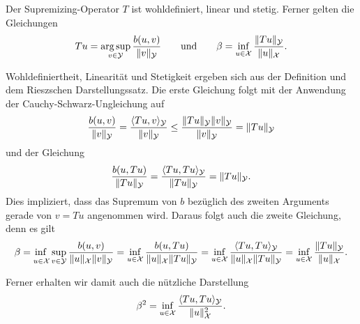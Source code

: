 \documentclass[../main.tex]{subfiles}
\begin{document}
\begin{Lemma}\label{lemma:supremizing_operator}
    Der Supremizing-Operator $T$ ist wohldefiniert, linear und stetig.
    Ferner gelten die Gleichungen
    \begin{equation}
        \label{eq:supremizing_operator_ist_argsup}
        Tu = \operatorname*{arg\,sup}_{v \in \mathcal Y} \frac{b(u, v)}{\lVert v\rVert_{\mathcal Y}}
        \qquad\text{und}\qquad
        \beta = \inf_{u \in \mathcal X} \frac{\lVert Tu\rVert_{\mathcal Y}}{\lVert u\rVert_{\mathcal X}}.
    \end{equation}

    \begin{Beweis}
        Wohldefiniertheit, Linearität und Stetigkeit ergeben sich aus der Definition und dem Rieszschen Darstellungssatz.
        Die erste Gleichung folgt mit der Anwendung der Cauchy-Schwarz-Ungleichung auf
        \begin{equation}
            \frac{b(u, v)}{\lVert v\rVert_{\mathcal Y}}
            = \frac{\langle Tu,v\rangle_{\mathcal Y}}{\lVert v\rVert_{\mathcal Y}}
            \leq \frac{\lVert Tu\rVert_{\mathcal Y} \lVert v\rVert_{\mathcal Y}}{\lVert v\rVert_{\mathcal Y}}
            = \lVert Tu\rVert_{\mathcal Y}
        \end{equation}
        und der Gleichung
        \begin{equation}
            \frac{b(u, Tu)}{\lVert Tu\rVert_{\mathcal Y}}
            = \frac{\langle Tu,Tu\rangle_{\mathcal Y}}{\lVert Tu\rVert_{\mathcal Y}}
            = \lVert Tu\rVert_{\mathcal Y}.
        \end{equation}
        Dies impliziert, dass das Supremum von $b$ bezüglich des zweiten Arguments gerade von $v = Tu$ angenommen wird.
        Daraus folgt auch die zweite Gleichung, denn es gilt
        \begin{equation}
            \beta
            = \infsup{u \in \mathcal X}{v \in \mathcal Y} \frac{b(u, v)}{\norm{u}_{\mathcal X} \norm{v}_{\mathcal Y}}
            = \inf_{u \in \mathcal X} \frac{b(u, Tu)}{\norm{u}_{\mathcal X} \norm{Tu}_{\mathcal Y}}
            = \inf_{u \in \mathcal X} \frac{\skp{Tu}{Tu}{\mathcal Y}}{\norm{u}_{\mathcal X}\norm{Tu}_{\mathcal Y}}
            = \inf_{u \in \mathcal X} \frac{\norm{Tu}_{\mathcal Y}}{\norm{u}_{\mathcal X}}.
        \end{equation}
    \end{Beweis}
\end{Lemma}
Ferner erhalten wir damit auch die nützliche Darstellung
\begin{equation}\label{eq:quadrat_der_inf_sup_konstante_ueber_supremizer}
    \beta^{2} = \inf_{u \in \mathcal X} \frac{\langle Tu,Tu\rangle_{\mathcal Y}}{\lVert u\rVert_{\mathcal X}^{2}}.
\end{equation}
\end{document}
